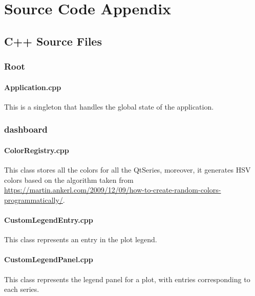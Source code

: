 
\part{Source Code Appendix}

\chapter{C++ Source Files}

\section{Root}

\subsection{Application.cpp}

This is a singleton that handles the global state of the application.

\section{dashboard}

\subsection{ColorRegistry.cpp}
\sloppy This class stores all the colors for all the QtSeries, moreover, it generates HSV colors based on the algorithm taken from \url{https://martin.ankerl.com/2009/12/09/how-to-create-random-colors-programmatically/}.


\subsection{CustomLegendEntry.cpp}
This class represents an entry in the plot legend.


\subsection{CustomLegendPanel.cpp}
This class represents the legend panel for a plot, with entries corresponding to each series.


